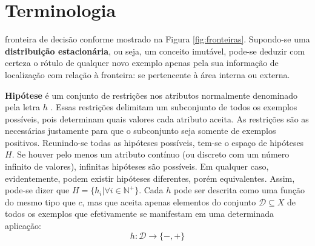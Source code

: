 \chapter{Terminologia}\label{terminologia}


fronteira de decisão conforme mostrado na Figura \ref{fig:fronteiras}.
Supondo-se uma \textbf{distribuição estacionária}, ou seja, um conceito imutável,
pode-se deduzir com certeza o rótulo de qualquer novo exemplo apenas pela sua
informação de localização com relação à fronteira: se pertencente à área interna ou externa.



\textbf{Hipótese} é um conjunto de restrições nos atributos normalmente denominado pela
letra $h$ \citep{mitchell1997machine}.
Essas restrições delimitam um subconjunto de todos os exemplos possíveis,
pois determinam quais valores cada atributo aceita.
As restrições são as necessárias justamente para que o subconjunto seja somente de exemplos
positivos.
Reunindo-se todas as hipóteses possíveis, tem-se o espaço de hipóteses $H$.
Se houver pelo menos um atributo contínuo (ou discreto com um número infinito de valores),
infinitas hipóteses são possíveis.
Em qualquer caso, evidentemente, podem existir hipóteses diferentes, porém equivalentes.
Assim, pode-se dizer que $H = \{h_i | \forall i \in \mathbb{N}^+\}$.
Cada $h$ pode ser descrita como uma função do mesmo tipo que $c$, mas que aceita apenas
elementos do conjunto $\mathcal{D} \subseteq X$ de todos os exemplos que efetivamente se
manifestam em uma determinada aplicação:
\begin{equation}
h: \mathcal{D} \rightarrow \{-,+\}
\end{equation}


